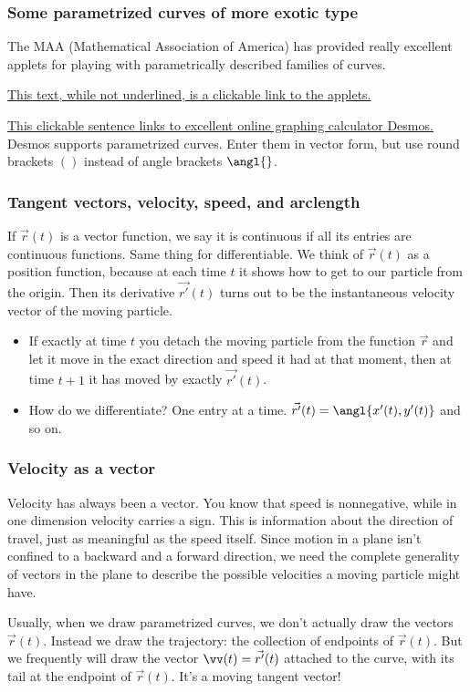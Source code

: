 \documentclass[11pt,ignorenonframetext,aspectratio=169,xcolor={svgnames}]{beamer}
\begin{document}
\begin{frame}\frametitle{Some parametrized curves of more exotic type}

The MAA (Mathematical Association of America) has provided really
excellent applets for playing with parametrically described families of
curves.

\href{http://www.maa.org/publications/periodicals/loci/resources/the-beauty-of-parametric-curves-the-applets}{This
text, while not underlined, is a clickable link to the applets.}

\href{http://www.desmos.com}{This clickable sentence links to excellent
online graphing calculator Desmos.} Desmos supports parametrized curves.
Enter them in vector form, but use round brackets $()$ instead of angle
brackets $\angl{}$.

\end{frame}

\begin{frame}\frametitle{Tangent vectors, velocity, speed, and
arclength}

If $\vec{r}(t)$ is a vector function, we say it is continuous if all its
entries are continuous functions. Same thing for differentiable. We
think of $\vec{r}(t)$ as a position function, because at each time $t$
it shows how to get to our particle from the origin. Then its derivative
$\vec{r'}(t)$ turns out to be the instantaneous velocity vector of the
moving particle.

\begin{itemize}[<+->]
\itemsep1pt\parskip0pt
\item
  If exactly at time $t$ you detach the moving particle from the
  function $\vec{r}$ and let it move in the exact direction and speed it
  had at that moment, then at time $t+1$ it has moved by exactly
  $\vec{r'}(t)$.
\item
  How do we differentiate? One entry at a time.
  $\vec{r'}(t) = \angl{x'(t), y'(t)}$ and so on.
\end{itemize}

\end{frame}

\begin{frame}\frametitle{Velocity as a vector}

Velocity has always been a vector. You know that speed is nonnegative,
while in one dimension velocity carries a sign. This is information
about the direction of travel, just as meaningful as the speed itself.
Since motion in a plane isn't confined to a backward and a forward
direction, we need the complete generality of vectors in the plane to
describe the possible velocities a moving particle might have.

Usually, when we draw parametrized curves, we don't actually draw the
vectors $\vec{r}(t)$. Instead we draw the trajectory: the collection of
endpoints of $\vec{r}(t)$. But we frequently will draw the vector
$\vv(t) = \vec{r'}(t)$ attached to the curve, with its tail at the
endpoint of $\vec{r}(t)$. It's a moving tangent vector!

\end{frame}
\end{document}

